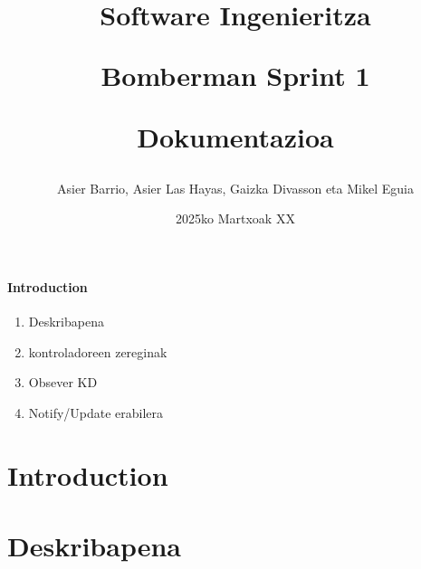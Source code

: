 \documentclass{article}
\title{\textbf{Software Ingenieritza}

Bomberman Sprint 1


Dokumentazioa}
\author{Asier Barrio, Asier Las Hayas, Gaizka Divasson eta Mikel Eguia }
\date{2025ko Martxoak XX}
\begin{document}
\maketitle
\newpage
\paragraph{Introduction}
\begin{enumerate}
    \item Deskribapena\dotfill 
    \item kontroladoreen zereginak\dotfill 
    
\begin{enumerate}


\end{enumerate}
\item Obsever KD\dotfill 

\item Notify/Update erabilera\dotfill 





\end{enumerate}
\newpage

\section{Introduction}

\section{Deskribapena}
\end{document}
